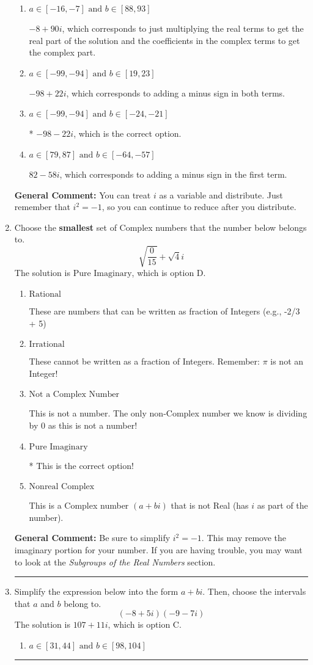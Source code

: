 \documentclass{extbook}[14pt]
\newcommand{\litem}[1]{\item #1

\rule{\textwidth}{0.4pt}}
\begin{document}
\begin{enumerate}
{\begin{enumerate}[label=\Alph*.]
 $82 + 58 i$, which corresponds to adding a minus sign in the second term.
\item \( a \in [-16, -7] \text{ and } b \in [88, 93] \)

 $-8 + 90 i$, which corresponds to just multiplying the real terms to get the real part of the solution and the coefficients in the complex terms to get the complex part.
\item \( a \in [-99, -94] \text{ and } b \in [19, 23] \)

 $-98 + 22 i$, which corresponds to adding a minus sign in both terms.
\item \( a \in [-99, -94] \text{ and } b \in [-24, -21] \)

* $-98 - 22 i$, which is the correct option.
\item \( a \in [79, 87] \text{ and } b \in [-64, -57] \)

 $82 - 58 i$, which corresponds to adding a minus sign in the first term.
\end{enumerate}

\textbf{General Comment:} You can treat $i$ as a variable and distribute. Just remember that $i^2=-1$, so you can continue to reduce after you distribute.
}
\litem{
Choose the \textbf{smallest} set of Complex numbers that the number below belongs to.
\[ \sqrt{\frac{0}{15}}+\sqrt{4}i \]The solution is \( \text{Pure Imaginary} \), which is option D.\begin{enumerate}[label=\Alph*.]
\item \( \text{Rational} \)

These are numbers that can be written as fraction of Integers (e.g., -2/3 + 5)
\item \( \text{Irrational} \)

These cannot be written as a fraction of Integers. Remember: $\pi$ is not an Integer!
\item \( \text{Not a Complex Number} \)

This is not a number. The only non-Complex number we know is dividing by 0 as this is not a number!
\item \( \text{Pure Imaginary} \)

* This is the correct option!
\item \( \text{Nonreal Complex} \)

This is a Complex number $(a+bi)$ that is not Real (has $i$ as part of the number).
\end{enumerate}

\textbf{General Comment:} Be sure to simplify $i^2 = -1$. This may remove the imaginary portion for your number. If you are having trouble, you may want to look at the \textit{Subgroups of the Real Numbers} section.
}
\litem{
Simplify the expression below into the form $a+bi$. Then, choose the intervals that $a$ and $b$ belong to.
\[ (-8 + 5 i)(-9 - 7 i) \]The solution is \( 107 + 11 i \), which is option C.\begin{enumerate}[label=\Alph*.]
\item \( a \in [31, 44] \text{ and } b \in [98, 104] \)


\end{enumerate}}
\end{enumerate}
\end{document}
